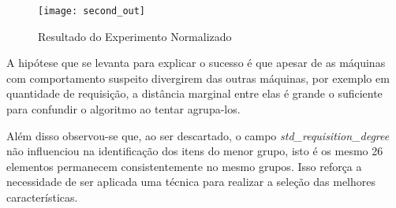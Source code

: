 \begin{figure}[htbp]
\centering
\texttt{[image: second\_out]}
\caption[Resultado do Experimento Normalizado]{Resultado do Experimento Normalizado} \label{fig:second_out}
\end{figure}

A hipótese que se levanta para explicar o sucesso é que apesar de as máquinas com comportamento suspeito divergirem das outras máquinas, por exemplo em quantidade de requisição, a distância marginal entre elas é grande o suficiente para confundir o algoritmo ao tentar agrupa-los.

Além disso observou-se que, ao ser descartado, o campo \textit{std\_requisition\_degree} não influenciou na identificação dos itens do menor grupo, isto é os mesmo 26 elementos permanecem consistentemente no mesmo grupos. Isso reforça a necessidade de ser aplicada uma técnica para realizar a seleção das melhores características.